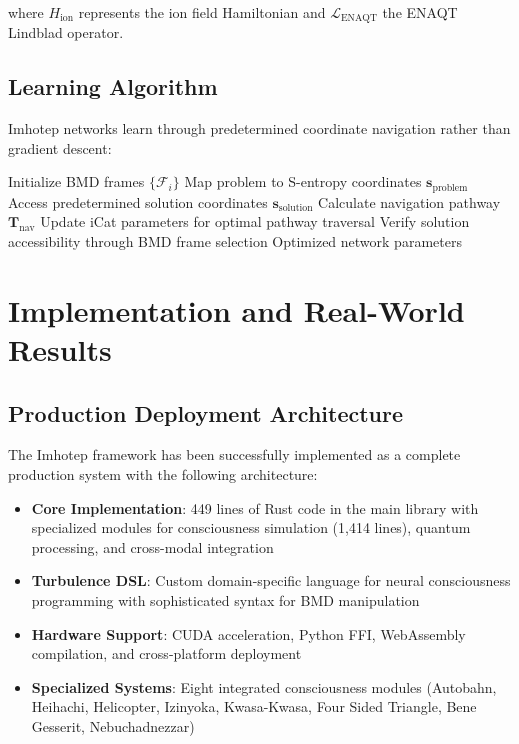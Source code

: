 \documentclass[12pt,a4paper]{article}
\theoremstyle{remark}
\begin{document}
where $H_{\text{ion}}$ represents the ion field Hamiltonian and $\mathcal{L}_{\text{ENAQT}}$ the ENAQT Lindblad operator.

\subsection{Learning Algorithm}

Imhotep networks learn through predetermined coordinate navigation rather than gradient descent:

\begin{algorithm}
\caption{Imhotep Learning Algorithm}
\begin{algorithmic}[1]
\STATE Initialize BMD frames $\{\mathcal{F}_i\}$
\STATE Map problem to S-entropy coordinates $\mathbf{s}_{\text{problem}}$
\STATE Access predetermined solution coordinates $\mathbf{s}_{\text{solution}}$
\STATE Calculate navigation pathway $\mathbf{T}_{\text{nav}}$
\STATE Update iCat parameters for optimal pathway traversal
\STATE Verify solution accessibility through BMD frame selection
\RETURN Optimized network parameters
\end{algorithmic}
\end{algorithm}

\section{Implementation and Real-World Results}

\subsection{Production Deployment Architecture}

The Imhotep framework has been successfully implemented as a complete production system with the following architecture:

\begin{itemize}
\item \textbf{Core Implementation}: 449 lines of Rust code in the main library with specialized modules for consciousness simulation (1,414 lines), quantum processing, and cross-modal integration
\item \textbf{Turbulence DSL}: Custom domain-specific language for neural consciousness programming with sophisticated syntax for BMD manipulation
\item \textbf{Hardware Support}: CUDA acceleration, Python FFI, WebAssembly compilation, and cross-platform deployment
\item \textbf{Specialized Systems}: Eight integrated consciousness modules (Autobahn, Heihachi, Helicopter, Izinyoka, Kwasa-Kwasa, Four Sided Triangle, Bene Gesserit, Nebuchadnezzar)
\end{itemize}
\end{document}
